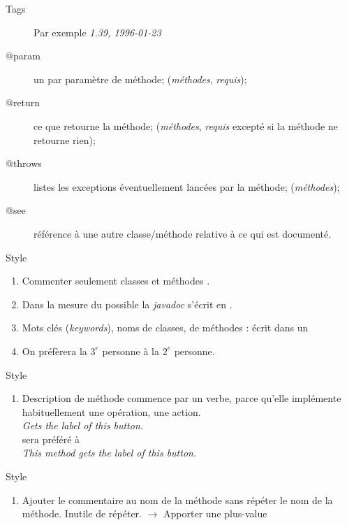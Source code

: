 \begin{hideedit}
\begin{frame}{Tags}
\begin{description}
      \par Par exemple \textit{1.39, 1996-01-23}
    \item[@param] un par paramètre de méthode;
      (\textit{méthodes}, \textit{requis});
    \item[@return] ce que retourne la méthode;
      (\textit{méthodes}, \textit{requis} excepté si la méthode ne retourne rien);
    \item[@throws] listes les exceptions éventuellement lancées par la méthode;
      (\textit{méthodes});
    \item[@see] référence à une autre classe/méthode relative
      à ce qui est documenté.
  \end{description}
\end{frame}

\begin{frame}[fragile]{Style}
  \begin{enumerate}[<+->]
    \item Commenter seulement classes et méthodes .
    \item Dans la mesure du possible la \textit{javadoc} s'écrit en
      .
    \item Mots clés (\textit{keywords}), noms de classes, de méthodes :
      écrit dans un  
    \item On préfèrera la $3^e$ personne à la $2^e$ personne.
    \seti
  \end{enumerate}
\end{frame}
\begin{frame}[fragile]{Style}
  \begin{enumerate}
    \conti
    \item Description de méthode commence par un verbe, parce qu'elle
      implémente habituellement une opération, une action.\\
      \medskip
      \quad\textit{Gets the label of this button.} \\
      sera préféré à \\
      \quad\textit{This method gets the label of this button.}
    \seti
  \end{enumerate}
\end{frame}
\begin{frame}[fragile]{Style}
  \begin{enumerate}
    \conti
    \item Ajouter le commentaire au nom de la méthode sans répéter le nom de la
      méthode. Inutile de répéter. \(\rightarrow\) Apporter une plus-value

\end{enumerate}
\end{frame}
\end{hideedit}
